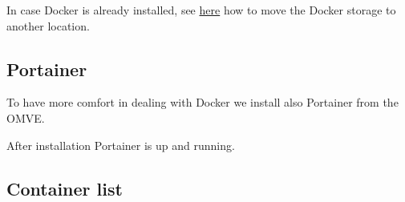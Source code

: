 In case \gls{Docker} is already installed, see \href{https://www.reddit.com/r/OpenMediaVault/comments/fl40gf/moving_docker_storage/}{here}
how to move the \gls{Docker} storage to another location.

\subsection{Portainer}

To have more comfort in dealing with \gls{Docker} we install also \gls{Portainer}
from the \gls{OMVE}.


After installation \gls{Portainer} is up and running.


\subsection{Container list}

